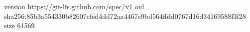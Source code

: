 version https://git-lfs.github.com/spec/v1
oid sha256:85b3a554330b82607cfed4dd72aa4467e9bd564ffdd0767d16d34169588f3f28
size 61569

